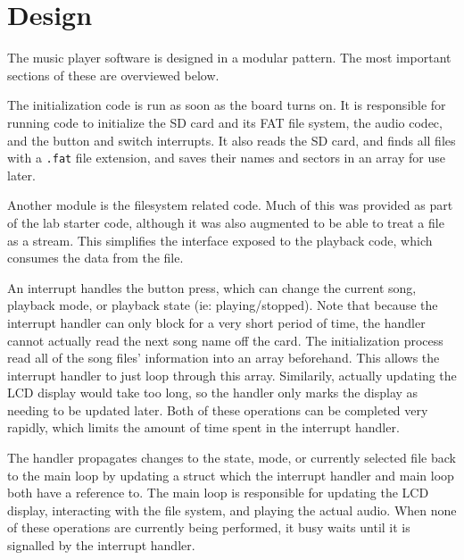 \documentclass[12pt]{article}
\begin{document}
\doublespacing

\section{Design}


The music player software is designed in a modular pattern.
The most important sections of these are overviewed below.

The initialization code is run as soon as the board turns on.
It is responsible for running code to initialize the SD card and its FAT file
system, the audio codec, and the button and switch interrupts.
It also reads the SD card, and finds all files with a \texttt{.fat} file
extension, and saves their names and sectors in an array for use later.

Another module is the filesystem related code.
Much of this was provided as part of the lab starter code, although it was also
augmented to be able to treat a file as a stream.
This simplifies the interface exposed to the playback code, which consumes the
data from the file.

An interrupt handles the button press, which can change the current song,
playback mode, or playback state (ie: playing/stopped).
Note that because the interrupt handler can only block for a very short period
of time, the handler cannot actually read the next song name off the card.
The initialization process read all of the song files' information into an
array beforehand.
This allows the interrupt handler to just loop through this array.
Similarily, actually updating the LCD display would take too long, so the
handler only marks the display as needing to be updated later.
Both of these operations can be completed very rapidly, which limits the amount
of time spent in the interrupt handler.

The handler propagates changes to the state, mode, or currently selected file
back to the main loop by updating a struct which the interrupt handler and main
loop both have a reference to.
The main loop is responsible for updating the LCD display, interacting with
the file system, and playing the actual audio.
When none of these operations are currently being performed,
it busy waits until it is signalled by the interrupt handler.
\end{document}
